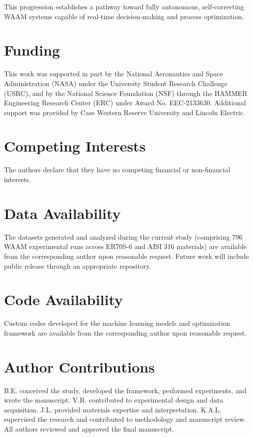\documentclass[11pt]{article}
\begin{document}
This progression establishes a pathway toward fully autonomous, self-correcting WAAM systems capable of real-time decision-making and process optimization.



\section*{Funding}
This work was supported in part by the National Aeronautics and Space Administration (NASA) under the University Student Research Challenge (USRC), and by the National Science Foundation (NSF) through the HAMMER Engineering Research Center (ERC) under Award No. EEC-2133630. Additional support was provided by Case Western Reserve University and Lincoln Electric.

\section*{Competing Interests}
The authors declare that they have no competing financial or non-financial interests.

\section*{Data Availability}
The datasets generated and analyzed during the current study (comprising 796 WAAM experimental runs across ER70S-6 and AISI 316 materials) are available from the corresponding author upon reasonable request. Future work will include public release through an appropriate repository.

\section*{Code Availability}
Custom codes developed for the machine learning models and optimization framework are available from the corresponding author upon reasonable request.

\section*{Author Contributions}
B.E. conceived the study, developed the framework, performed experiments, and wrote the manuscript. V.R. contributed to experimental design and data acquisition. J.L. provided materials expertise and interpretation. K.A.L. supervised the research and contributed to methodology and manuscript review. All authors reviewed and approved the final manuscript.
\end{document}
